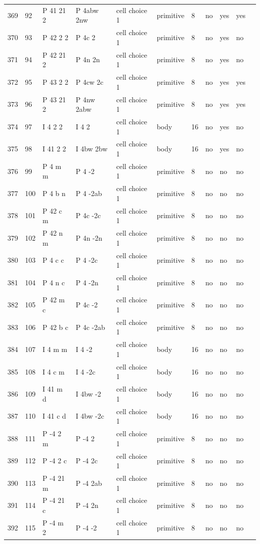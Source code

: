 \begin{center}
\begin{small}
\begin{longtable}{|l|l|l|l|l|l|l|l|l|l|l|}
369 &92 &P 41 21 2 &P 4abw 2nw &cell choice 1 &primitive &8 &no &yes &yes \\ 
370 &93 &P 42 2 2 &P 4c 2 &cell choice 1 &primitive &8 &no &yes &no \\ 
371 &94 &P 42 21 2 &P 4n 2n &cell choice 1 &primitive &8 &no &yes &no \\ 
372 &95 &P 43 2 2 &P 4cw 2c &cell choice 1 &primitive &8 &no &yes &yes \\ 
373 &96 &P 43 21 2 &P 4nw 2abw &cell choice 1 &primitive &8 &no &yes &yes \\ 
374 &97 &I 4 2 2 &I 4 2 &cell choice 1 &body &16 &no &yes &no \\ 
375 &98 &I 41 2 2 &I 4bw 2bw &cell choice 1 &body &16 &no &yes &no \\ 
376 &99 &P 4 m m &P 4 -2 &cell choice 1 &primitive &8 &no &no &no \\ 
377 &100 &P 4 b n &P 4 -2ab &cell choice 1 &primitive &8 &no &no &no \\ 
378 &101 &P 42 c m &P 4c -2c &cell choice 1 &primitive &8 &no &no &no \\ 
379 &102 &P 42 n m &P 4n -2n &cell choice 1 &primitive &8 &no &no &no \\ 
380 &103 &P 4 c c &P 4 -2c &cell choice 1 &primitive &8 &no &no &no \\ 
381 &104 &P 4 n c &P 4 -2n &cell choice 1 &primitive &8 &no &no &no \\ 
382 &105 &P 42 m c &P 4c -2 &cell choice 1 &primitive &8 &no &no &no \\ 
383 &106 &P 42 b c &P 4c -2ab &cell choice 1 &primitive &8 &no &no &no \\ 
384 &107 &I 4 m m &I 4 -2 &cell choice 1 &body &16 &no &no &no \\ 
385 &108 &I 4 c m &I 4 -2c &cell choice 1 &body &16 &no &no &no \\ 
386 &109 &I 41 m d &I 4bw -2 &cell choice 1 &body &16 &no &no &no \\ 
387 &110 &I 41 c d &I 4bw -2c &cell choice 1 &body &16 &no &no &no \\ 
388 &111 &P -4 2 m &P -4 2 &cell choice 1 &primitive &8 &no &no &no \\ 
389 &112 &P -4 2 c &P -4 2c &cell choice 1 &primitive &8 &no &no &no \\ 
390 &113 &P -4 21 m &P -4 2ab &cell choice 1 &primitive &8 &no &no &no \\ 
391 &114 &P -4 21 c &P -4 2n &cell choice 1 &primitive &8 &no &no &no \\ 
392 &115 &P -4 m 2 &P -4 -2 &cell choice 1 &primitive &8 &no &no &no \\ 

\end{longtable}
\end{small}
\end{center}

